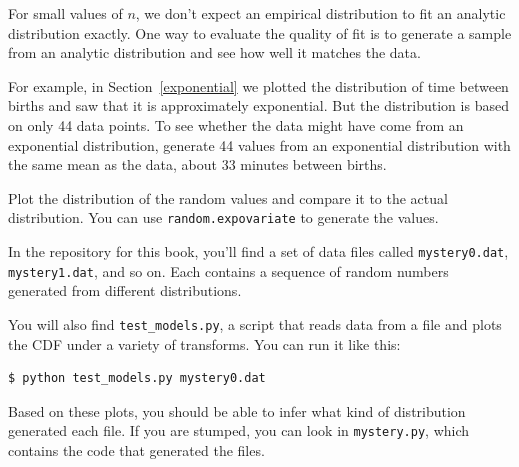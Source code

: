 \documentclass[12pt]{book}
\begin{document}
\begin{exercise}
For small values of $n$, we don't expect an empirical distribution
to fit an analytic distribution exactly.  One way to evaluate
the quality of fit is to generate a sample from an analytic
distribution and see how well it matches the data.

For example, in Section~\ref{exponential} we plotted the distribution
of time between births and saw that it is approximately exponential.
But the distribution is based on only 44 data points.  To see whether
the data might have come from an exponential distribution, generate 44
values from an exponential distribution with the same mean as the
data, about 33 minutes between births.

Plot the distribution of the random values and compare it to the
actual distribution.  You can use {\tt random.expovariate} 
to generate the values.

\end{exercise}


\begin{exercise}
In the repository for this book, you'll find a set of data files
called {\tt mystery0.dat}, {\tt mystery1.dat}, and so on.  Each
contains a sequence of random numbers generated from different
distributions.

You will also find \verb"test_models.py", a script that reads
data from a file and plots the CDF under a variety of transforms.
You can run it like this:

\begin{verbatim}
$ python test_models.py mystery0.dat
\end{verbatim}

Based on these plots, you should be able to infer what kind of
distribution generated each file.  If you are stumped, you can
look in {\tt mystery.py}, which contains the code that generated
the files.

\end{exercise}
\end{document}
